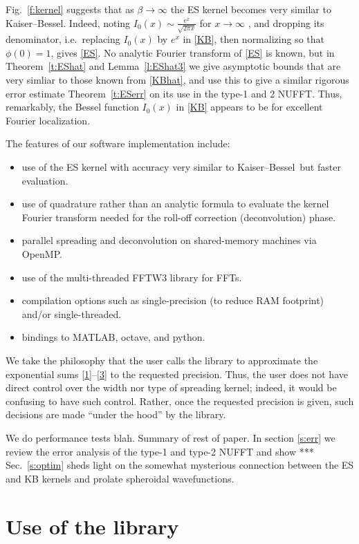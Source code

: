\documentclass[10pt]{article}
\newcommand{\bi}{\begin{itemize}}
\newcommand{\ei}{\end{itemize}}
\newcommand{\freq}{\beta}          %
\newcommand{\KB}{Kaiser--Bessel}
\begin{document}
Fig.~\ref{f:kernel} suggests that as $\freq\to\infty$ the ES kernel
becomes very similar to \KB.
Indeed, noting
$I_0(x) \sim \frac{e^x}{\sqrt{2\pi x}}$ for $x\to\infty$ \cite[(10.30.4)]{dlmf},
and dropping its denominator, i.e.\ replacing $I_0(x)$ by $e^x$ in \eqref{KB},
then normalizing so that $\phi(0)=1$, gives \eqref{ES}.
No analytic Fourier transform of \eqref{ES} is known,
but in Theorem~\ref{t:EShat} and Lemma~\ref{l:EShat3}
we give asymptotic bounds that are very simliar to those known
from \eqref{KBhat}, and use this to give a similar 
rigorous error estimate Theorem~\ref{t:ESerr}
on its use in the type-1 and 2 NUFFT.
Thus, remarkably, the Bessel function $I_0(x)$ in \eqref{KB}
appears to be for excellent Fourier localization.

The features of our software implementation include:
\bi
\item use of the ES kernel with accuracy very similar to \KB\ but
  faster evaluation.
\item use of quadrature rather than an analytic formula to evaluate
  the kernel Fourier transform needed for the roll-off correction
  (deconvolution) phase.
\item parallel spreading and deconvolution on shared-memory machines via OpenMP.
\item use of the multi-threaded FFTW3 library for FFTs.
\item compilation options such as single-precision (to reduce RAM footprint)
  and/or single-threaded.
\item bindings to MATLAB, octave, and python.
\ei

We take the philosophy that the user calls the library to approximate the
exponential sums \eqref{1}--\eqref{3} to the requested precision.
Thus, the user does not have direct control over the width nor type of
spreading kernel; indeed, it would be confusing to have such control.
Rather, once the requested precision is given, such decisions
are made ``under the hood'' by the library.

We do performance tests blah.
Summary of rest of paper.
In section \ref{s:err} we review the error analysis of the type-1 and type-2
NUFFT and show ***
Sec.~\ref{s:optim} sheds light on the somewhat mysterious
connection between the ES and KB kernels and prolate spheroidal wavefunctions.




\section{Use of the library}
\end{document}
